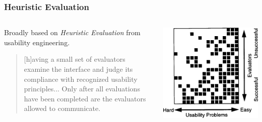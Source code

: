\documentclass[handout, notes=hide]{beamer}
\newcommand{\prestext}[1]{\footnotetext{\cite{#1}}}
\begin{document}
\begin{frame}
\frametitle{Heuristic Evaluation}
\setlength{\parskip}{0.5em}

\begin{columns}[T]
\begin{column}[T]{0.7\textwidth}
Broadly based on {\it Heuristic Evaluation} from usability engineering.
\begin{quotation}
[h]aving a small set of evaluators examine the interface and judge its compliance with recognized usability principles... Only after all evaluations have been completed are the evaluators allowed to communicate.
\end{quotation}
\end{column}
\begin{column}[T]{0.3\textwidth}
\hspace{-1.0cm}
\includegraphics[width=1.3\textwidth,left]{heuristiceval}
\end{column}
\end{columns}
\prestext{Nielsen_1994}
\end{frame}
\end{document}
